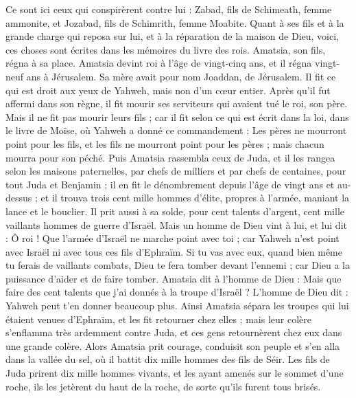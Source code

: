 \begin{multicols}{2}
Ce sont ici ceux qui conspirèrent contre lui : Zabad, fils de Schimeath, femme ammonite, et Jozabad, fils de Schimrith, femme Moabite.
Quant à ses fils et à la grande charge qui reposa sur lui, et à la réparation de la maison de Dieu, voici, ces choses sont écrites dans les mémoires du livre des rois. Amatsia, son fils, régna à sa place.
\VerseOne{}Amatsia devint roi à l'âge de vingt-cinq ans, et il régna vingt-neuf ans à Jérusalem. Sa mère avait pour nom Joaddan, de Jérusalem.
Il fit ce qui est droit aux yeux de Yahweh, mais non d'un cœur entier.
Après qu'il fut affermi dans son règne, il fit mourir ses serviteurs qui avaient tué le roi, son père.
Mais il ne fit pas mourir leurs fils ; car il fit selon ce qui est écrit dans la loi, dans le livre de Moïse, où Yahweh a donné ce commandement : Les pères ne mourront point pour les fils, et les fils ne mourront point pour les pères ; mais chacun mourra pour son péché.
Puis Amatsia rassembla ceux de Juda, et il les rangea selon les maisons paternelles, par chefs de milliers et par chefs de centaines, pour tout Juda et Benjamin ; il en fit le dénombrement depuis l'âge de vingt ans et au-dessus ; et il trouva trois cent mille hommes d'élite, propres à l'armée, maniant la lance et le bouclier.
Il prit aussi à sa solde, pour cent talents d'argent, cent mille vaillants hommes de guerre d'Israël.
Mais un homme de Dieu vint à lui, et lui dit : Ô roi ! Que l'armée d'Israël ne marche point avec toi ; car Yahweh n'est point avec Israël ni avec tous ces fils d'Ephraïm.
Si tu vas avec eux, quand bien même tu ferais de vaillants combats, Dieu te fera tomber devant l'ennemi ; car Dieu a la puissance d'aider et de faire tomber.
Amatsia dit à l'homme de Dieu : Mais que faire des cent talents que j'ai donnés à la troupe d'Israël ? L'homme de Dieu dit : Yahweh peut t'en donner beaucoup plus.
Ainsi Amatsia sépara les troupes qui lui étaient venues d'Ephraïm, et les fit retourner chez elles ; mais leur colère s'enflamma très ardemment contre Juda, et ces gens retournèrent chez eux dans une grande colère.
Alors Amatsia prit courage, conduisit son peuple et s'en alla dans la vallée du sel, où il battit dix mille hommes des fils de Séir.
Les fils de Juda prirent dix mille hommes vivants, et les ayant amenés sur le sommet d'une roche, ils les jetèrent du haut de la roche, de sorte qu'ils furent tous brisés.

\end{multicols}
